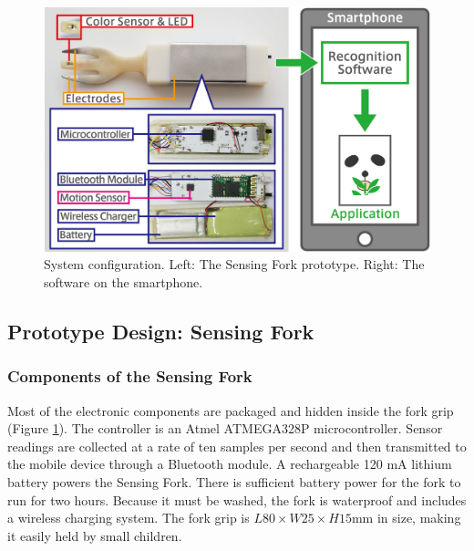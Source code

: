 
\begin{figure}[t]
\begin{center}
\includegraphics[width=12cm]{image/systemzu02-02.png}
\caption{System configuration. Left: The Sensing Fork prototype. Right: The software on the smartphone.}
\label{system}
\end{center}
\end{figure}

\subsection{Prototype Design: Sensing Fork}
\subsubsection{Components of the Sensing Fork}
Most of the electronic components 
are packaged and hidden inside the fork grip (Figure \ref{system}). 
The controller is an Atmel ATMEGA328P microcontroller. 
Sensor readings are collected at a rate of ten samples per second and then transmitted 
to the mobile device through a Bluetooth module. 
A rechargeable 120 mA lithium battery powers the Sensing Fork. 
There is sufficient battery power for the fork to run for two hours. 
Because it must be washed, the fork is waterproof and includes a wireless charging system. 
The fork grip is $L80 \times W25 \times H15$mm in size, 
making it easily held by small children. 

